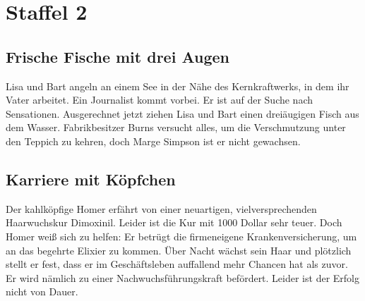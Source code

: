
\section{Staffel 2}

\subsection{Frische Fische mit drei Augen}\label{7F01}
Lisa und Bart angeln an einem See in der Nähe des Kernkraftwerks, in dem ihr Vater arbeitet. Ein Journalist kommt vorbei. Er ist auf der Suche nach Sensationen. Ausgerechnet jetzt ziehen Lisa und Bart einen dreiäugigen Fisch aus dem Wasser. Fabrikbesitzer Burns versucht alles, um die Verschmutzung unter den Teppich zu kehren, doch Marge Simpson ist er nicht gewachsen.


\subsection{Karriere mit Köpfchen}\label{7F02}
Der kahlköpfige Homer erfährt von einer neuartigen, vielversprechenden Haar\-wuchs\-kur \glqq Dimoxinil\grqq . Leider ist die Kur mit 1000 Dollar sehr teuer. Doch Homer weiß sich zu helfen: Er betrügt die firmeneigene Krankenversicherung, um an das begehrte Elixier zu kommen. Über Nacht wächst sein Haar und plötzlich stellt er fest, dass er im Geschäftsleben auffallend mehr Chancen hat als zuvor. Er wird nämlich zu einer Nachwuchsführungskraft befördert. Leider ist der Erfolg nicht von Dauer.

